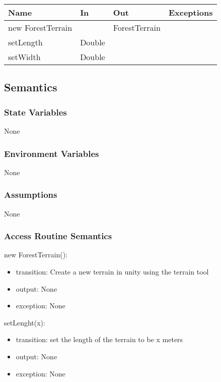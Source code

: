 \documentclass[12pt, titlepage]{article}
\begin{document}
\begin{center}
\begin{tabular}{|p{3cm}|p{4cm}|p{4cm}| p{5cm}|}
\hline
\textbf{Name} & \textbf{In} & \textbf{Out} & \textbf{Exceptions} \\
\hline
new ForestTerrain & & ForestTerrain & \\
\hline
setLength & Double & & \\ 
\hline
setWidth & Double & & \\ 
\hline
\end{tabular}
\end{center}

\subsection{Semantics}

\subsubsection{State Variables}
None

\subsubsection{Environment Variables}
None

\subsubsection{Assumptions}
None

\subsubsection{Access Routine Semantics}

\noindent new ForestTerrain():
\begin{itemize}
\item transition: Create a new terrain in unity using the terrain tool
\item output: None
\item exception: None
\end{itemize}

\noindent setLenght(x):
\begin{itemize}
\item transition: set the length of the terrain to be x meters
\item output: None
\item exception: None
\end{itemize}
\end{document}
